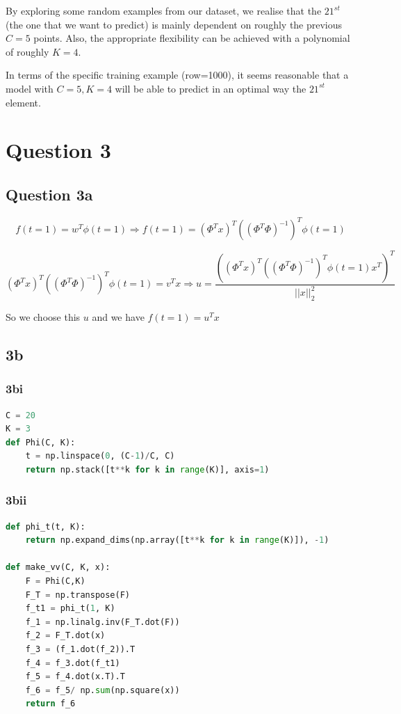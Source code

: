 \documentclass{article}
\begin{document}
By exploring some random examples from our dataset, we realise that the $21^{st}$ (the one that we want to predict) is mainly dependent on roughly the previous $C=5$ points. Also, the appropriate flexibility can be achieved with a polynomial of roughly $K = 4$.

In terms of the specific training example (row=1000), it seems reasonable that a model with $C=5, K=4$ will be able to predict in an optimal way the $21^{st}$ element.

\section{Question 3}

\subsection{Question 3a}
$$\displaystyle f(t=1)=w^T \phi(t=1) \Rightarrow f(t=1)=(\Phi^Tx)^T((\Phi^T\Phi)^{-1})^T\phi(t=1)$$

$$(\Phi^Tx)^T((\Phi^T\Phi)^{-1})^T\phi(t=1)=v^Tx\Rightarrow u=\displaystyle \frac{((\Phi^Tx)^T((\Phi^T\Phi)^{-1})^T\phi(t=1)x^T)^T}{||x||_{2}^2}$$

So we choose this $u$ and we have $f(t=1)=u^Tx$

\subsection{3b}

\subsubsection{3bi}
\begin{lstlisting}[language=Python]
C = 20
K = 3
def Phi(C, K):
    t = np.linspace(0, (C-1)/C, C)
    return np.stack([t**k for k in range(K)], axis=1)
\end{lstlisting}

\subsubsection{3bii}
\begin{lstlisting}[language=Python]
def phi_t(t, K):
    return np.expand_dims(np.array([t**k for k in range(K)]), -1)

def make_vv(C, K, x):
    F = Phi(C,K)
    F_T = np.transpose(F)
    f_t1 = phi_t(1, K)
    f_1 = np.linalg.inv(F_T.dot(F))
    f_2 = F_T.dot(x)
    f_3 = (f_1.dot(f_2)).T
    f_4 = f_3.dot(f_t1)
    f_5 = f_4.dot(x.T).T
    f_6 = f_5/ np.sum(np.square(x))
    return f_6
\end{lstlisting}
\end{document}
